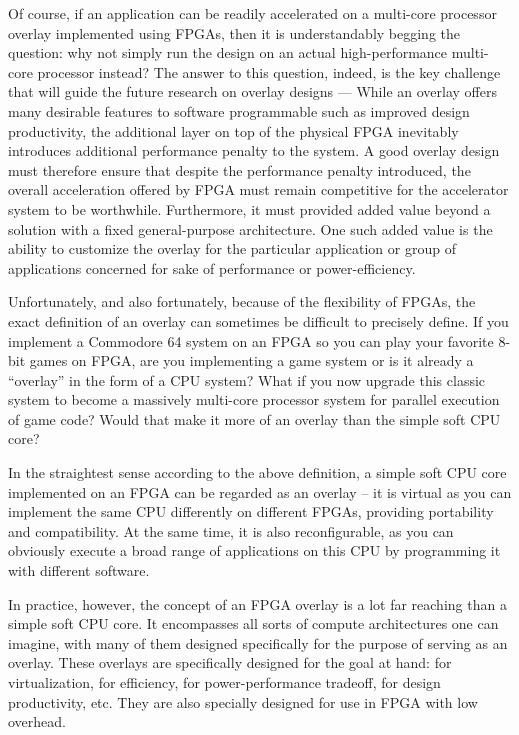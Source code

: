 Of course, if an application can be readily accelerated on a multi-core processor overlay implemented using FPGAs, then it is understandably begging the question: why not simply run the design on an actual high-performance multi-core processor instead?
The answer to this question, indeed, is the key challenge that will guide the future research on overlay designs --- While an overlay offers many desirable features to software programmable such as improved design productivity, the additional layer on top of the physical FPGA inevitably introduces additional performance penalty to the system.
A good overlay design must therefore ensure that despite the performance penalty introduced, the overall acceleration offered by FPGA must remain competitive for the accelerator system to be worthwhile.
Furthermore, it must provided added value beyond a solution with a fixed general-purpose architecture.
One such added value is the ability to customize the overlay for the particular application or group of applications concerned for sake of performance or power-efficiency.



\iffalse

Unfortunately, and also fortunately, because of the flexibility of FPGAs, the exact definition of an overlay can sometimes be difficult to precisely define.  If you implement a Commodore 64 system on an FPGA so you can play your favorite 8-bit games on FPGA, are you implementing a game system or is it already a ``overlay'' in the form of a CPU system?
What if you now upgrade this classic system to become a massively multi-core processor system for parallel execution of game code?  Would that make it more of an overlay than the simple soft CPU core?


In the straightest sense according to the above definition, a simple soft CPU core implemented on an FPGA can be regarded as an overlay -- it is virtual as you can implement the same CPU differently on different FPGAs, providing portability and compatibility.  At the same time, it is also reconfigurable, as you can obviously execute a broad range of applications on this CPU by programming it with different software.


In practice, however, the concept of an FPGA overlay is a lot far reaching than a simple soft CPU core.  It encompasses all sorts of compute architectures one can imagine, with many of them designed specifically for the purpose of serving as an overlay.  These overlays are specifically designed for the goal at hand: for virtualization, for efficiency, for power-performance tradeoff, for design productivity, etc.  They are also specially designed for use in FPGA with low overhead.

